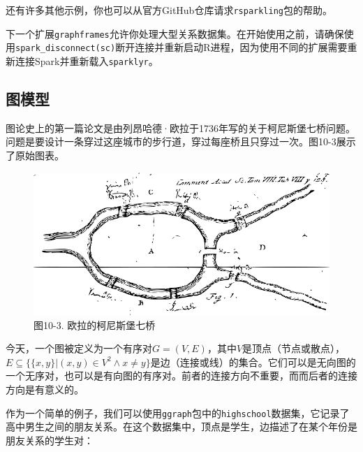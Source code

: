 \documentclass[
]{article}
\begin{document}
还有许多其他示例，你也可以从官方GitHub仓库请求\texttt{rsparkling}包的帮助。

下一个扩展\texttt{graphframes}允许你处理大型关系数据集。在开始使用之前，请确保使用\texttt{spark\_disconnect(sc)}断开连接并重新启动R进程，因为使用不同的扩展需要重新连接Spark并重新载入\texttt{sparklyr}。

\hypertarget{ux56feux6a21ux578b}{%
\subsection{图模型}\label{ux56feux6a21ux578b}}

图论史上的第一篇论文是由列昂哈德·欧拉于1736年写的关于柯尼斯堡七桥问题。问题是要设计一条穿过这座城市的步行道，穿过每座桥且只穿过一次。图10-3展示了原始图表。

\begin{figure}
\centering
\includegraphics{figures/10_3.png}
\caption{图10-3. 欧拉的柯尼斯堡七桥}
\end{figure}

今天，一个图被定义为一个有序对\(G = (V, E)\)，其中\(V\)是顶点（节点或散点），\(E \subseteq \{ \{x, y\}|(x,y) \in V^2 \wedge x\ne y\}\)是边（连接或线）的集合。它们可以是无向图的一个无序对，也可以是有向图的有序对。前者的连接方向不重要，而而后者的连接方向是有意义的。

作为一个简单的例子，我们可以使用\texttt{ggraph}包中的\texttt{highschool}数据集，它记录了高中男生之间的朋友关系。在这个数据集中，顶点是学生，边描述了在某个年份是朋友关系的学生对：
\end{document}
